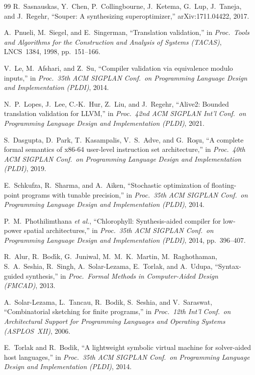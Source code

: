\documentclass[journal,10pt]{IEEEtran}
\begin{document}
\begin{thebibliography}{99}
R.~Sasnauskas, Y.~Chen, P.~Collingbourne, J.~Ketema, G.~Lup,
J.~Taneja, and J.~Regehr, ``Souper: A synthesizing superoptimizer,''
arXiv:1711.04422, 2017.

A.~Pnueli, M.~Siegel, and E.~Singerman, ``Translation validation,'' in
\emph{Proc.\ Tools and Algorithms for the Construction and Analysis of
Systems (TACAS)}, LNCS~1384, 1998, pp.~151--166.

V.~Le, M.~Afshari, and Z.~Su, ``Compiler validation via equivalence
modulo inputs,'' in \emph{Proc.\ 35th ACM SIGPLAN Conf.\ on Programming
Language Design and Implementation (PLDI)}, 2014.

N.~P.~Lopes, J.~Lee, C.-K.~Hur, Z.~Liu, and J.~Regehr, ``Alive2:
Bounded translation validation for LLVM,'' in \emph{Proc.\ 42nd ACM
SIGPLAN Int'l Conf.\ on Programming Language Design and Implementation
(PLDI)}, 2021.

S.~Dasgupta, D.~Park, T.~Kasampalis, V.~S.~Adve, and G.~Ro\c{s}u,
``A complete formal semantics of x86-64 user-level instruction set
architecture,'' in \emph{Proc.\ 40th ACM SIGPLAN Conf.\ on Programming
Language Design and Implementation (PLDI)}, 2019.

E.~Schkufza, R.~Sharma, and A.~Aiken, ``Stochastic optimization of
floating-point programs with tunable precision,'' in \emph{Proc.\ 35th
ACM SIGPLAN Conf.\ on Programming Language Design and Implementation
(PLDI)}, 2014.

P.~M.~Phothilimthana \emph{et al.}, ``Chlorophyll: Synthesis-aided
compiler for low-power spatial architectures,'' in \emph{Proc.\ 35th
ACM SIGPLAN Conf.\ on Programming Language Design and Implementation
(PLDI)}, 2014, pp.~396--407.

R.~Alur, R.~Bod{\'\i}k, G.~Juniwal, M.~M.~K.~Martin, M.~Raghothaman,
S.~A.~Seshia, R.~Singh, A.~Solar-Lezama, E.~Torlak, and A.~Udupa,
``Syntax-guided synthesis,'' in \emph{Proc.\ Formal Methods in
Computer-Aided Design (FMCAD)}, 2013.

A.~Solar-Lezama, L.~Tancau, R.~Bodik, S.~Seshia, and V.~Saraswat,
``Combinatorial sketching for finite programs,'' in \emph{Proc.\ 12th
Int'l Conf.\ on Architectural Support for Programming Languages and
Operating Systems (ASPLOS~XII)}, 2006.

E.~Torlak and R.~Bodik, ``A lightweight symbolic virtual machine for
solver-aided host languages,'' in \emph{Proc.\ 35th ACM SIGPLAN Conf.\
on Programming Language Design and Implementation (PLDI)}, 2014.


\end{thebibliography}
\end{document}
